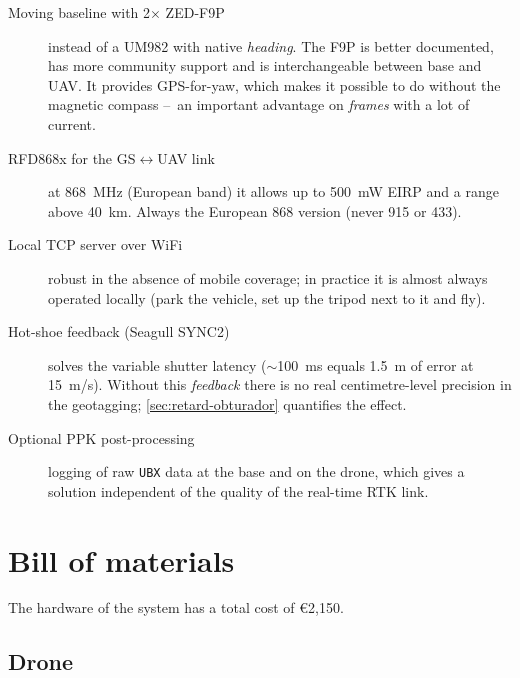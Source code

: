 \begin{description}
    \item[Moving baseline with 2$\times$ ZED-F9P] instead of a UM982 with native \emph{heading}. The F9P is better documented, has more community support and is interchangeable between base and UAV. It provides GPS-for-yaw, which makes it possible to do without the magnetic compass --~an important advantage on \emph{frames} with a lot of current.
    \item[RFD868x for the GS$\leftrightarrow$UAV link] at 868~MHz (European band) it allows up to 500~mW EIRP and a range above 40~km. Always the European 868 version (never 915 or 433).
    \item[Local TCP server over WiFi] robust in the absence of mobile coverage; in practice it is almost always operated locally (park the vehicle, set up the tripod next to it and fly).
    \item[Hot-shoe feedback (Seagull SYNC2)] solves the variable shutter latency ($\sim$100~ms equals 1.5~m of error at 15~m/s). Without this \emph{feedback} there is no real centimetre-level precision in the geotagging; \cref{sec:retard-obturador} quantifies the effect.
    \item[Optional PPK post-processing] logging of raw \texttt{UBX} data at the base and on the drone, which gives a solution independent of the quality of the real-time RTK link.
\end{description}

\section{Bill of materials}
\label{sec:materials}

The hardware of the system has a total cost of €2,150.

\subsection{Drone}

